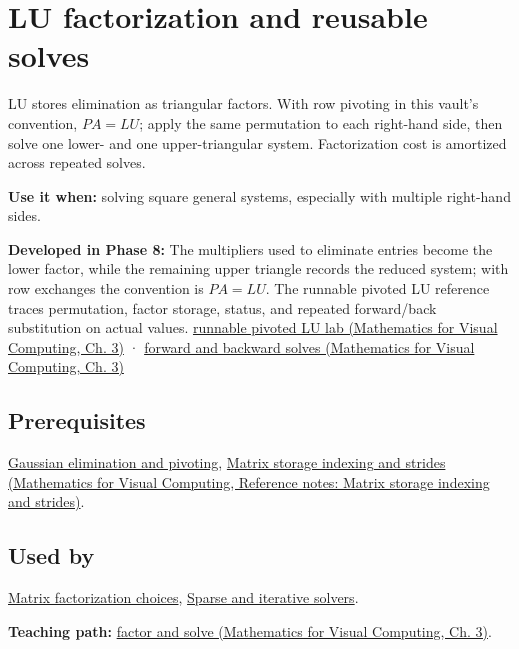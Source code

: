 \hypertarget{appendix-55e4b5b0a1e6}{}\label{referencestart:appendix-55e4b5b0a1e6}
\section{LU factorization and reusable solves}\label{appendix-55e4b5b0a1e6-lu-factorization-and-reusable-solves}

LU stores elimination as triangular factors. With row pivoting in this vault's convention, \(PA=LU\); apply the same permutation to each right-hand side, then solve one lower- and one upper-triangular system. Factorization cost is amortized across repeated solves.

\textbf{Use it when:} solving square general systems, especially with multiple right-hand sides.

\textbf{Developed in Phase 8:} The multipliers used to eliminate entries become the lower factor, while the remaining upper triangle records the reduced system; with row exchanges the convention is \(PA=LU\). The runnable pivoted LU reference traces permutation, factor storage, status, and repeated forward/back substitution on actual values. \href{../02-Mathematics-for-Visual-Computing/main.pdf\#nameddest=01-foundations-i-ch019-a-runnable-pivoted-lu-reference-preserves-the-elimination-history}{runnable pivoted LU lab (Mathematics for Visual Computing, Ch. 3)} · \href{../02-Mathematics-for-Visual-Computing/main.pdf\#nameddest=01-foundations-i-ch019-triangular-solves-perform-the-cheap-second-half}{forward and backward solves (Mathematics for Visual Computing, Ch. 3)}

\subsection{Prerequisites}\label{appendix-55e4b5b0a1e6-prerequisites}

\hyperref[appendix-f6e77f4a200f]{Gaussian elimination and pivoting}, \href{../02-Mathematics-for-Visual-Computing/main.pdf\#nameddest=appendix-ffdc1d4e5350}{Matrix storage indexing and strides (Mathematics for Visual Computing, Reference notes: Matrix storage indexing and strides)}.

\subsection{Used by}\label{appendix-55e4b5b0a1e6-used-by}

\hyperref[appendix-221a483bec2d]{Matrix factorization choices}, \hyperref[appendix-67c87a3d9e94]{Sparse and iterative solvers}.

\textbf{Teaching path:} \href{../02-Mathematics-for-Visual-Computing/main.pdf\#nameddest=01-foundations-i-ch019-elimination-turns-the-geometry-into-an-auditable-calculation}{factor and solve (Mathematics for Visual Computing, Ch. 3)}.
